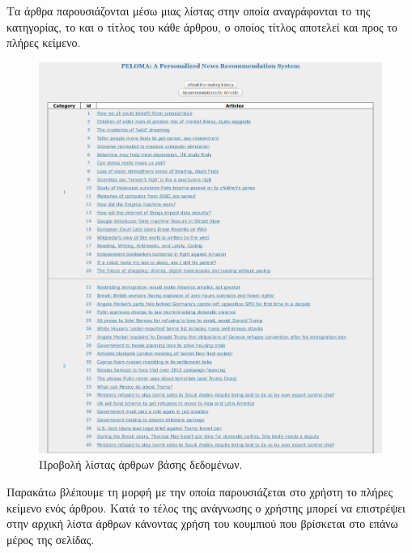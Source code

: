 \newpage

Τα άρθρα παρουσιάζονται μέσω μιας λίστας στην οποία αναγράφονται το {} της κατηγορίας, το {} και ο τίτλος του κάθε άρθρου, 
ο οποίος τίτλος αποτελεί και {} προς το πλήρες κείμενο. \\

\begin{figure}[!ht] \centering
\centerline{
    \includegraphics[scale=0.38]{static/figures/peloma/articles.png}}
    \caption{Προβολή λίστας άρθρων βάσης δεδομένων.}
    \label{}
\end{figure} 

\newpage

Παρακάτω βλέπουμε τη μορφή με την οποία παρουσιάζεται στο χρήστη το πλήρες κείμενο ενός άρθρου. 
Κατά το τέλος της ανάγνωσης ο χρήστης μπορεί να επιστρέψει στην αρχική λίστα άρθρων 
κάνοντας χρήση του κουμπιού \textit{{}} που βρίσκεται στο επάνω μέρος της σελίδας. \\

